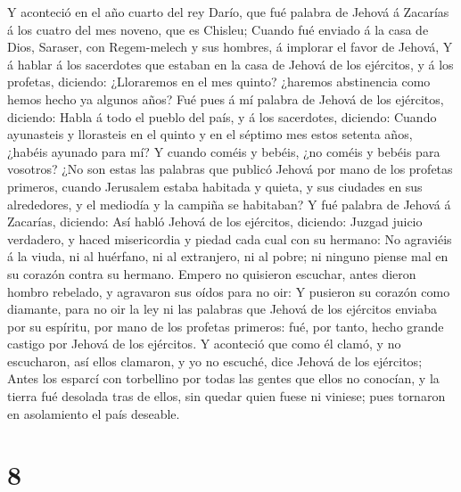  Y aconteció en el año cuarto del rey Darío, que fué
palabra de Jehová á Zacarías á los cuatro del mes noveno, que es
Chisleu;  Cuando fué enviado á la casa de Dios, Saraser,
con Regem-melech y sus hombres, á implorar el favor de Jehová,
 Y á hablar á los sacerdotes que estaban en la casa de
Jehová de los ejércitos, y á los profetas, diciendo: ¿Lloraremos en el
mes quinto? ¿haremos abstinencia como hemos hecho ya algunos años?
 Fué pues á mí palabra de Jehová de los ejércitos,
diciendo:  Habla á todo el pueblo del país, y á los
sacerdotes, diciendo: Cuando ayunasteis y llorasteis en el quinto y en
el séptimo mes estos setenta años, ¿habéis ayunado para mí?
 Y cuando coméis y bebéis, ¿no coméis y bebéis para
vosotros?  ¿No son estas las palabras que publicó Jehová
por mano de los profetas primeros, cuando Jerusalem estaba habitada y
quieta, y sus ciudades en sus alrededores, y el mediodía y la campiña se
habitaban?  Y fué palabra de Jehová á Zacarías, diciendo:
 Así habló Jehová de los ejércitos, diciendo: Juzgad
juicio verdadero, y haced misericordia y piedad cada cual con su
hermano:  No agraviéis á la viuda, ni al huérfano, ni al
extranjero, ni al pobre; ni ninguno piense mal en su corazón contra su
hermano.  Empero no quisieron escuchar, antes dieron
hombro rebelado, y agravaron sus oídos para no oir:  Y
pusieron su corazón como diamante, para no oir la ley ni las palabras
que Jehová de los ejércitos enviaba por su espíritu, por mano de los
profetas primeros: fué, por tanto, hecho grande castigo por Jehová de
los ejércitos.  Y aconteció que como él clamó, y no
escucharon, así ellos clamaron, y yo no escuché, dice Jehová de los
ejércitos;  Antes los esparcí con torbellino por todas
las gentes que ellos no conocían, y la tierra fué desolada tras de
ellos, sin quedar quien fuese ni viniese; pues tornaron en asolamiento
el país deseable.

\hypertarget{section-7}{%
\section{8}\label{section-7}}

